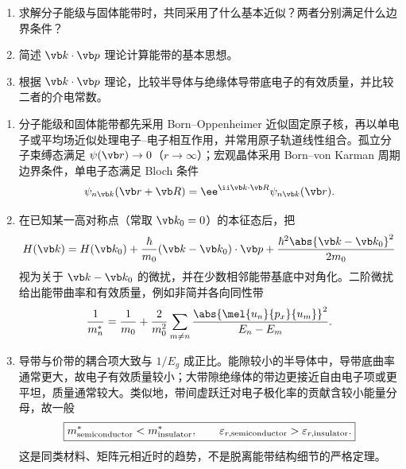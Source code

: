 \begin{question}[10 分]
\begin{enumerate}
  \item 求解分子能级与固体能带时，共同采用了什么基本近似？两者分别满足什么边界条件？
  \item 简述 $\vb k\cdot\vb p$ 理论计算能带的基本思想。
  \item 根据 $\vb k\cdot\vb p$ 理论，比较半导体与绝缘体导带底电子的有效质量，并比较二者的介电常数。
\end{enumerate}


\begin{solution}
\begin{enumerate}
  \item 分子能级和固体能带都先采用 Born--Oppenheimer 近似固定原子核，再以单电子或平均场近似处理电子--电子相互作用，并常用原子轨道线性组合。孤立分子束缚态满足
  $\psi(\vb r)\to0$（$r\to\infty$）；宏观晶体采用 Born--von Karman 周期边界条件，单电子态满足 Bloch 条件
  \[
    \psi_{n\vb k}(\vb r+\vb R)=
    \ee^{\ii\vb k\cdot\vb R}\psi_{n\vb k}(\vb r).
  \]
  \item 在已知某一高对称点（常取 $\vb k_0=0$）的本征态后，把
  \[
    H(\vb k)=H(\vb k_0)+\frac{\hbar}{m_0}(\vb k-\vb k_0)\cdot\vb p
    +\frac{\hbar^2\abs{\vb k-\vb k_0}^2}{2m_0}
  \]
  视为关于 $\vb k-\vb k_0$ 的微扰，并在少数相邻能带基底中对角化。二阶微扰给出能带曲率和有效质量，例如非简并各向同性带
  \[
    \frac1{m_n^*}=\frac1{m_0}
    +\frac{2}{m_0^2}\sum_{m\ne n}
    \frac{\abs{\mel{u_n}{p_x}{u_m}}^2}{E_n-E_m}.
  \]
  \item 导带与价带的耦合项大致与 $1/E_g$ 成正比。能隙较小的半导体中，导带底曲率通常更大，故电子有效质量较小；大带隙绝缘体的带边更接近自由电子项或更平坦，质量通常较大。类似地，带间虚跃迁对电子极化率的贡献含较小能量分母，故一般
  \[
    \boxed{m^*_{\rm semiconductor}<m^*_{\rm insulator},
    \qquad \varepsilon_{r,\rm semiconductor}>
    \varepsilon_{r,\rm insulator}.}
  \]
  这是同类材料、矩阵元相近时的趋势，不是脱离能带结构细节的严格定理。
\end{enumerate}
\end{solution}
\end{question}

